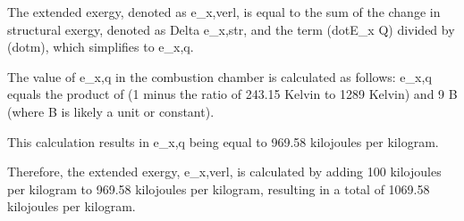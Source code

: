 The extended exergy, denoted as e_{x,verl}, is equal to the sum of the change in structural exergy, denoted as Delta e_{x,str}, and the term (dot{E}_x Q) divided by (dot{m}), which simplifies to e_{x,q}.

The value of e_{x,q} in the combustion chamber is calculated as follows:
e_{x,q} equals the product of (1 minus the ratio of 243.15 Kelvin to 1289 Kelvin) and 9 B (where B is likely a unit or constant).

This calculation results in e_{x,q} being equal to 969.58 kilojoules per kilogram.

Therefore, the extended exergy, e_{x,verl}, is calculated by adding 100 kilojoules per kilogram to 969.58 kilojoules per kilogram, resulting in a total of 1069.58 kilojoules per kilogram.